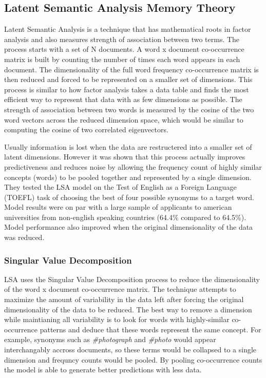 \documentclass[man,floatsintext]{apa6}
\begin{document}
\subsection{Latent Semantic Analysis Memory Theory}

Latent Semantic Analysis \parencite{Landauer1997} is a technique that has mathematical roots in factor analysis and also measures strength of association between two terms.
The process starts with a set of N documents.
A word x document co-occurrence matrix is built by counting the number of times each word appears in each document.
The dimensionality of the full word frequency co-occurrence matrix is then reduced and forced to be represented on a smaller set of dimensions.
This process is similar to how factor analysis takes a data table and finds the most efficient way to represent that data with as few dimensions as possible.
The strength of association between two words is measured by the cosine of the two word vectors across the reduced dimension space, which would be similar to computing the cosine of two correlated eigenvectors.

Usually information is lost when the data are restructered into a smaller set of latent dimensions.
However it was shown that this process actually improves predictiveness and reduces noise by allowing the frequency count of highly similar concepts (words) to be pooled together and represented by a single dimension.
They tested the LSA model on the Test of English as a Foreign Language (TOEFL) task of choosing the best of four possible synonyms to a target word.
Model results were on par with a large sample of applicants to american universities from non-english speaking countries (64.4\% compared to 64.5\%).
Model performance also improved when the original dimensionality of the data was reduced.

\subsubsection{Singular Value Decomposition}

LSA uses the Singular Value Decomposition process to reduce the dimensionality of the word x document co-occurrence matrix.
The technique attempts to maximize the amount of variability in the data left after forcing the original dimensionality of the data to be reduced.
The best way to remove a dimension while maintianing all variability is to look for words with highly-similar co-occurrence patterns and deduce that these words represent the same concept.
For example, synonyms such as \emph{\#photograph} and \emph{\#photo} would appear interchangably accross documents, so these terms would be collapsed to a single dimension and frequncy counts would be pooled.
By pooling co-occurrence counts the model is able to generate better predictions with less data.
\end{document}
